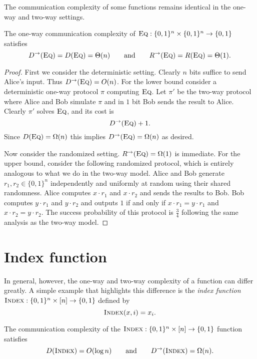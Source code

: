 The communication complexity of some functions remains identical in the one-way and two-way settings.

\begin{theorem}
The one-way communication complexity of $\textsc{Eq} : \{0,1\}^n \times \{0,1\}^n \to \{0,1\}$ satisfies
\[
D^\rightarrow(\textsc{Eq}) = D(\textsc{Eq}) = \Theta(n) \qquad \mbox{and} \qquad 
R^\rightarrow(\textsc{Eq}) = R(\textsc{Eq}) = \Theta(1).
\]
\end{theorem}

\begin{proof}
	
First we consider the deterministic setting. Clearly $n$ bits suffice to send Alice's input. Thus $D^\rightarrow(\textsc{Eq}) = O(n)$. For the lower bound consider a deterministic one-way protocol $\pi$ computing $\textsc{Eq}$. Let $\pi'$ be the two-way protocol where Alice and Bob simulate $\pi$ and in $1$ bit Bob sends the result to Alice. Clearly $\pi'$ solves $\textsc{Eq}$, and its cost is
$$D^\rightarrow(\textsc{Eq}) + 1.$$
Since $D(\textsc{Eq}) = \Omega(n)$ this implies $D^\rightarrow(\textsc{Eq}) = \Omega(n)$ as desired.

Now consider the randomized setting. $R^\rightarrow(\textsc{Eq}) = \Omega(1)$ is immediate. For the upper bound, consider the following randomized protocol, which is entirely analogous to what we do in the two-way model. Alice and Bob generate $r_1, r_2 \in \{0,1\}^n$ independently and uniformly at random using their shared randomness. Alice computes $x\cdot r_1$ and $x\cdot r_2$ and sends the results to Bob. Bob computes $y\cdot r_1$ and $y\cdot r_2$ and outputs $1$ if and only if $x\cdot r_1 = y\cdot r_1$ and $x\cdot r_2 = y\cdot r_2$. The success probability of this protocol is $\frac{3}{4}$ following the same analysis as the two-way model.

\end{proof}


\newpage 
\section{Index function}

In general, however, the one-way and two-way complexity of a function can differ greatly. A simple example that highlights this difference is the \emph{index function} $\textsc{Index} : \{0,1\}^n \times [n] \to \{0,1\}$ defined by
\[
\textsc{Index}(x,i) = x_i.
\]

\begin{theorem}
The communication complexity of the $\textsc{Index} : \{0,1\}^n \times [n] \to \{0,1\}$ function satisfies
\[
D(\textsc{Index}) = O(\log n) \qquad \mbox{and} \qquad D^\rightarrow(\textsc{Index}) = \Omega(n).
\]
\end{theorem}

